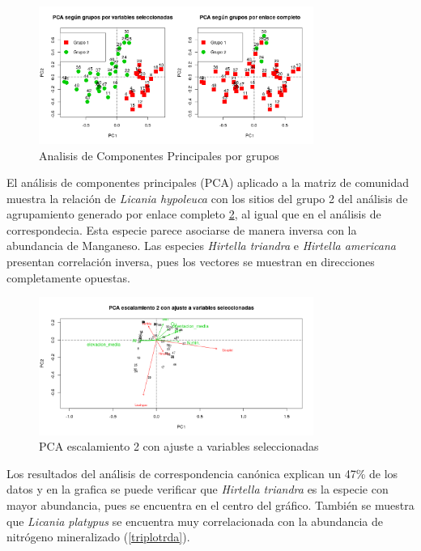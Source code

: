 \documentclass[11pt,]{article}
\begin{document}
\begin{figure}
\centering
\includegraphics[width=0.80000\textwidth]{PCA_porgrupos.png}
\caption{Analisis de Componentes Principales por grupos\label{pcagroup}}
\end{figure}

El análisis de componentes principales (PCA) aplicado a la matriz de
comunidad muestra la relación de \emph{Licania hypoleuca} con los sitios
del grupo 2 del análisis de agrupamiento generado por enlace completo
\ref{pcaespecies}, al igual que en el análisis de correspondecia. Esta
especie parece asociarse de manera inversa con la abundancia de
Manganeso. Las especies \emph{Hirtella triandra} e \emph{Hirtella
americana} presentan correlación inversa, pues los vectores se muestran
en direcciones completamente opuestas.

\begin{figure}
\centering
\includegraphics[width=0.80000\textwidth]{PCA_especies.png}
\caption{PCA escalamiento 2 con ajuste a variables
seleccionadas\label{pcaespecies}}
\end{figure}

Los resultados del análisis de correspondencia canónica explican un 47\%
de los datos y en la grafica se puede verificar que \emph{Hirtella
triandra} es la especie con mayor abundancia, pues se encuentra en el
centro del gráfico. También se muestra que \emph{Licania platypus} se
encuentra muy correlacionada con la abundancia de nitrógeno mineralizado
(\ref{triplotrda}).
\end{document}

